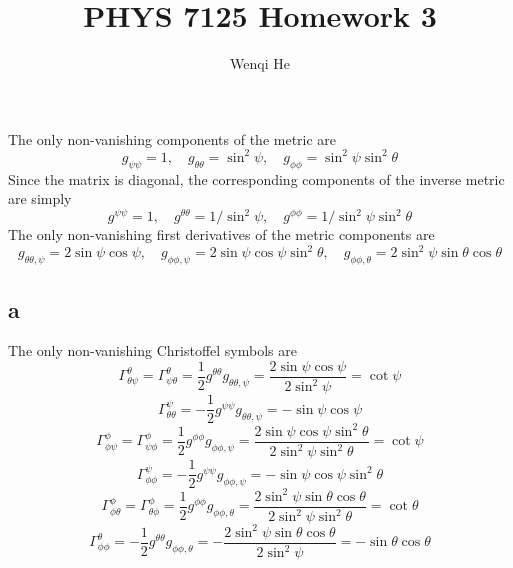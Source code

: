 \documentclass{article}
\title{PHYS 7125 Homework 3}
\author{Wenqi He}
\begin{document}
\maketitle
\section{}
\section{}
The only non-vanishing components of the metric are 
\[ g_{\psi\psi} = 1, \quad  g_{\theta\theta}= \sin^2\psi, \quad g_{\phi\phi} = \sin^2\psi \sin^2\theta\]
Since the matrix is diagonal, the corresponding components of the inverse metric are simply
\[ g^{\psi\psi} = 1, \quad  g^{\theta\theta} = 1/\sin^2\psi, \quad g^{\phi\phi} = 1/\sin^2\psi \sin^2\theta\]
The only non-vanishing first derivatives of the metric components are
\[ g_{\theta\theta,\psi} = 2\sin\psi\cos\psi, \quad g_{\phi\phi,\psi} = 2\sin\psi\cos\psi\sin^2\theta,
	\quad g_{\phi\phi,\theta} = 2\sin^2\psi \sin\theta\cos\theta \]
\subsection*{a}
The only non-vanishing Christoffel symbols are
\[ \Gamma^\theta_{\theta\psi} = \Gamma^\theta_{\psi\theta} = \frac{1}{2}g^{\theta\theta}g_{\theta\theta,\psi}
	= \frac{2\sin\psi\cos\psi}{2\sin^2\psi} = \cot\psi \]
\[ \Gamma^\psi_{\theta\theta} = -\frac{1}{2}g^{\psi\psi}g_{\theta\theta,\psi} = -\sin\psi\cos\psi \]
\[ \Gamma^\phi_{\phi\psi} = \Gamma^\phi_{\psi\phi} = \frac{1}{2}g^{\phi\phi}g_{\phi\phi,\psi}
	= \frac{2\sin\psi\cos\psi\sin^2\theta}{2\sin^2\psi\sin^2\theta} = \cot\psi \]
\[ \Gamma^\psi_{\phi\phi} = -\frac{1}{2}g^{\psi\psi}g_{\phi\phi,\psi} = -\sin\psi\cos\psi\sin^2\theta\]
\[ \Gamma^\phi_{\phi\theta} =  \Gamma^\phi_{\theta\phi} = \frac{1}{2}g^{\phi\phi}g_{\phi\phi,\theta}
	= \frac{2\sin^2\psi\sin\theta\cos\theta}{2\sin^2\psi\sin^2\theta} = \cot\theta\]
\[ \Gamma^\theta_{\phi\phi} = -\frac{1}{2}g^{\theta\theta}g_{\phi\phi,\theta}
	= -\frac{2\sin^2\psi\sin\theta\cos\theta}{2\sin^2\psi} = -\sin\theta\cos\theta \]
\end{document}
